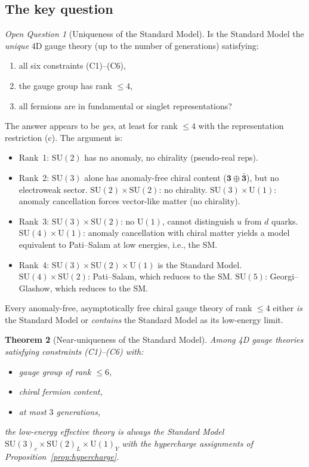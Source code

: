 \documentclass[12pt]{article}
\newtheorem{theorem}{Theorem}[section]
\theoremstyle{definition}
\theoremstyle{remark}
\newtheorem{openq}[theorem]{Open Question}
\newcommand{\SU}{\mathrm{SU}}
\newcommand{\UU}{\mathrm{U}}
\begin{document}
\subsection{The key question}

\begin{openq}[Uniqueness of the Standard Model]
\label{openq:unique}
Is the Standard Model the \emph{unique} 4D gauge theory
(up to the number of generations) satisfying:
\begin{enumerate}[label=(\alph*)]
\item all six constraints (C1)--(C6),
\item the gauge group has rank $\leq 4$,
\item all fermions are in fundamental or singlet representations?
\end{enumerate}
\end{openq}

The answer appears to be \emph{yes}, at least for rank $\leq 4$
with the representation restriction (c).  The argument is:
\begin{itemize}
\item Rank~1: $\SU(2)$ has no anomaly, no chirality (pseudo-real reps).
\item Rank~2: $\SU(3)$ alone has anomaly-free chiral content
  ($\mathbf{3} \oplus \bar{\mathbf{3}}$), but no electroweak sector.
  $\SU(2) \times \SU(2)$: no chirality.
  $\SU(3) \times \UU(1)$: anomaly cancellation forces vector-like
  matter (no chirality).
\item Rank~3: $\SU(3) \times \SU(2)$: no $\UU(1)$, cannot
  distinguish $u$ from $d$ quarks.  $\SU(4) \times \UU(1)$: anomaly
  cancellation with chiral matter yields a model equivalent to
  Pati--Salam at low energies, i.e., the SM.
\item Rank~4: $\SU(3) \times \SU(2) \times \UU(1)$ is the
  Standard Model.  $\SU(4) \times \SU(2)$: Pati--Salam, which
  reduces to the SM.
  $\SU(5)$: Georgi--Glashow, which reduces to the SM.
\end{itemize}

Every anomaly-free, asymptotically free chiral gauge theory
of rank $\leq 4$ either \emph{is} the Standard Model or
\emph{contains} the Standard Model as its low-energy limit.

\begin{theorem}[Near-uniqueness of the Standard Model]
\label{thm:near_unique}
Among 4D gauge theories satisfying constraints (C1)--(C6) with:
\begin{itemize}
\item gauge group of rank $\leq 6$,
\item chiral fermion content,
\item at most $3$ generations,
\end{itemize}
the low-energy effective theory is always the Standard Model
$\SU(3)_c \times \SU(2)_L \times \UU(1)_Y$ with the hypercharge
assignments of Proposition~\ref{prop:hypercharge}.
\end{theorem}
\end{document}
